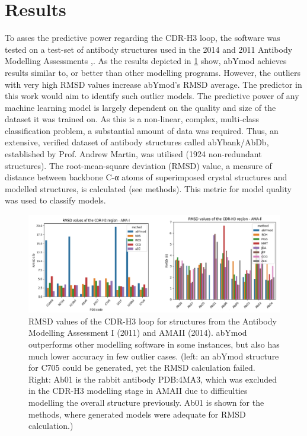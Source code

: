 \documentclass[preprint,12pt]{elsarticle}
\begin{document}
\section{Results}
\label{sec:sample2}
To asses the predictive power regarding the CDR-H3 loop, the software was tested on a test-set of antibody structures used in the 2014 and 2011 Antibody Modelling Assessments \cite{Almagro2014},\cite{Almagro2011}. As the results depicted in \ref{fig:AMA} show, abYmod achieves results similar to, or better than other modelling programs. However, the outliers with very high RMSD values increase abYmod’s RMSD average. The predictor in this work would aim to identify such outlier models.
The predictive power of any machine learning model is largely dependent on the quality and size of the dataset it was trained on. As this is a non-linear, complex, multi-class classification problem, a substantial amount of data was required. Thus, an extensive, verified dataset of antibody structures called abYbank/AbDb\cite{Almagro2011}, established by Prof. Andrew Martin, was utilised (1924 non-redundant structures). The root-mean-square deviation (RMSD) value, a measure of distance between backbone C-α atoms of superimposed crystal structures and modelled structures, is calculated (see methods). This metric for model quality was used to classify models. 
\begin{figure}[h!]
  \centering
  \includegraphics[scale=0.3]{AMA}
  \caption {RMSD values of the CDR-H3 loop for structures from the Antibody Modelling Assessment I
(2011) and AMAII (2014). abYmod outperforms other modelling software in some instances, but
also has much lower accuracy in few outlier cases. (left: an abYmod structure for C705 could be
generated, yet the RMSD calculation failed. Right: Ab01 is the rabbit antibody PDB:4MA3,
which was excluded in the CDR-H3 modelling stage in AMAII due to difficulties modelling the
overall structure previously. Ab01 is shown for the methods, where generated models were
adequate for RMSD calculation.)}
  \label{fig:AMA}
\end{figure}
\end{document}
